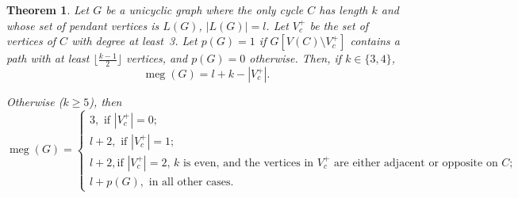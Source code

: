 \documentclass[10pt,a4paper]{article}
\newtheorem{theorem}{Theorem}[section]
\DeclareMathOperator{\MEG}{meg}
\begin{document}
\begin{theorem} \label{uct}
Let $G$ be a unicyclic graph where the only cycle $C$ has length $k$ and whose set of pendant vertices is $L(G)$, $|L(G)| = l$. Let $V_{c}^{+}$ be the set of vertices of $C$ with degree at least~3. Let $p(G)=1$  %
if $G[V(C)\setminus V_{c}^{+}]$ contains a path with at least $\lfloor\frac{k-1}{2}\rfloor$ vertices, 
and $p(G)=0$ otherwise.
Then, if $k\in \{3,4\}$,
\begin{equation*}
\MEG(G) = l + k - |V_c^{+}|.
\end{equation*}

Otherwise ($k \geq 5$), then
\begin{equation*}
\MEG(G) = 
\begin{cases}
3, \text{ if $|V_c^{+}|=0$;}\\
l + 2, \text{ if $|V_c^{+}|=1$;}\\
l + 2, \text{if $|V_c^{+}|=2$, $k$ is even, and the vertices in $V_c^{+}$ are either adjacent or opposite on $C$;}\\
l + p(G), \text{ in all other cases.}
\end{cases}    
\end{equation*}
\end{theorem}
\end{document}
